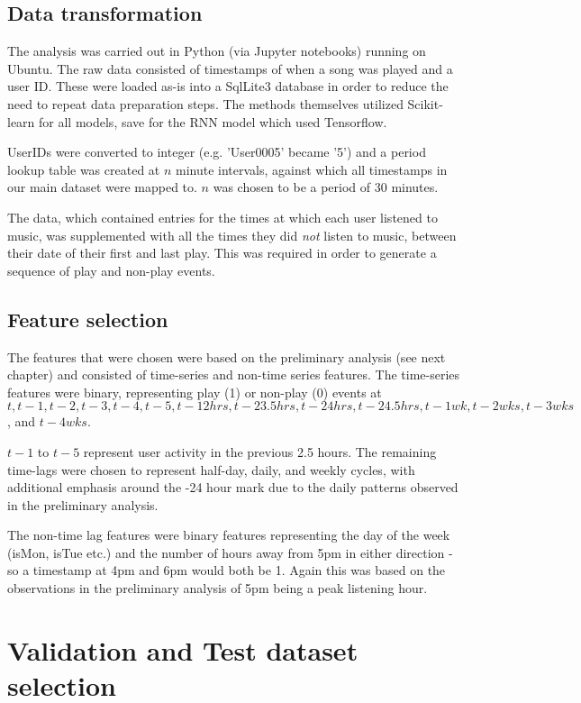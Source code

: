 \subsection{Data transformation}

The analysis was carried out in Python (via Jupyter notebooks) running on Ubuntu. The raw data consisted of timestamps of when a song was played and a user ID. These were loaded as-is into a SqlLite3 database in order to reduce the need to repeat data preparation steps. The methods themselves utilized Scikit-learn for all models, save for the RNN model which used Tensorflow.

UserIDs were converted to integer (e.g. 'User0005' became '5') and a period lookup table was created at $n$ minute intervals, against which all timestamps in our main dataset were mapped to. $n$ was chosen to be a period of 30 minutes.

The data, which contained entries for the times at which each user listened to music, was supplemented with all the times they did \emph{not} listen to music, between their date of their first and last play.  This was required in order to generate a sequence of play and non-play events. 

\subsection{Feature selection}

The features that were chosen were based on the preliminary analysis (see next chapter) and consisted of time-series and non-time series features. The time-series features were binary, representing play (1) or non-play (0) events at $t, t-1, t-2, t-3, t-4, t-5,  t-12hrs, t-23.5hrs, t-24hrs, t-24.5hrs, t-1wk, t-2wks, t-3wks$, and $t-4wks$.

$t-1$ to $t-5$ represent user activity in the previous 2.5 hours. The remaining time-lags were chosen to represent half-day, daily, and weekly cycles, with additional emphasis around the -24 hour mark due to the daily patterns observed in the preliminary analysis.  

The non-time lag features were binary features representing the day of the week (isMon, isTue etc.) and the number of hours away from 5pm in either direction - so a timestamp at 4pm and 6pm would both be 1. Again this was based on the observations in the preliminary analysis of 5pm being a peak listening hour.

\section{Validation and Test dataset selection}

